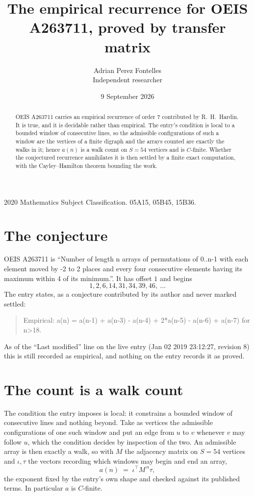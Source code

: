 \documentclass[11pt,a4paper]{article}
\title{The empirical recurrence for OEIS A263711, proved by transfer matrix}
\author{Adrian Perez Fontelles\\ \small Independent researcher}
\date{9 September 2026}
\theoremstyle{plain}
\theoremstyle{definition}
\begin{document}
\maketitle

\begin{abstract}
OEIS A263711 carries an empirical recurrence of order $7$ contributed by R.~H.~Hardin. It is
true, and it is decidable rather than empirical. The entry's condition is local to a bounded window of consecutive lines, so
the admissible configurations of such a window are the vertices of a finite digraph and the
arrays counted are exactly the walks in it; hence $a(n)$ is a walk count on $S=54$ vertices
and is $C$-finite. Whether the conjectured recurrence annihilates it is then settled by a
finite exact computation, with the Cayley--Hamilton theorem bounding the work.
\end{abstract}

\noindent\small 2020 Mathematics Subject Classification. 05A15, 05B45, 15B36.\normalsize

\section{The conjecture}

OEIS A263711 is ``Number of length n arrays of permutations of 0..n-1 with each element moved by -2 to 2 places and every four consecutive elements having its maximum within 4 of its minimum.''. It has offset $1$ and begins
\[
1, 2, 6, 14, 31, 34, 39, 46,\ \dots
\]
The entry states, as a conjecture contributed by its author and never marked settled:
\begin{quote}
Empirical: a(n) = a(n-1) + a(n-3) - a(n-4) + 2*a(n-5) - a(n-6) + a(n-7) for n>18.
\end{quote}
As of the ``Last modified'' line on the live entry (Jan 02 2019 23:12:27, revision 8) this is still
recorded as empirical, and nothing on the entry records it as proved.

\section{The count is a walk count}

The condition the entry imposes is local: it constrains a bounded window of consecutive lines and nothing beyond. Take as
vertices the admissible configurations of one such window and put an edge from $u$ to $v$
whenever $v$ may follow $u$, which the condition decides by inspection of the two. An
admissible array is then exactly a walk, so with $M$ the adjacency matrix on $S=54$ vertices
and $\iota,\tau$ the vectors recording which windows may begin and end an array,
\[
a(n)\;=\;\iota^{\!\top}M^{\,n}\tau ,
\]
the exponent fixed by the entry's own shape and checked against its published terms. In
particular $a$ is $C$-finite.
\end{document}
